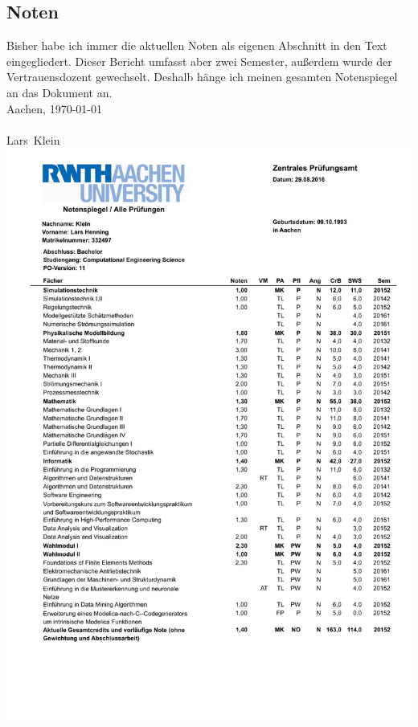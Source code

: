 \documentclass[12pt]{article}
\newcommand{\Datum}{\today}
\newcommand{\Nachname}{Klein}
\newcommand{\Vorname}{Lars}
\newcommand{\Ort}{Aachen}
\begin{document}
\begin{large}
\subsection*{Noten}
Bisher habe ich immer die aktuellen Noten als eigenen Abschnitt in den Text eingegliedert. Dieser Bericht umfasst aber zwei Semester, außerdem wurde der Vertrauensdozent gewechselt. Deshalb hänge ich meinen gesamten Notenspiegel an das Dokument an.
\bigskip
\\
\Ort, \Datum\\
\\
\Vorname~\Nachname
\\
\includegraphics[width=500pt]{Notenspiegel}


\end{large}
\end{document}
